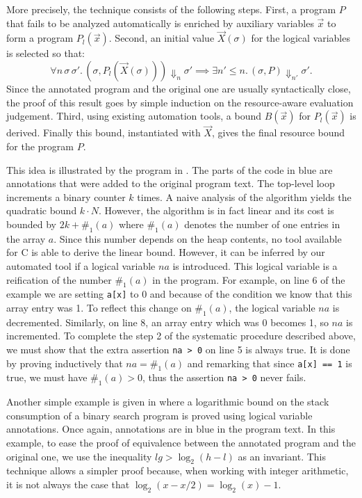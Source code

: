 \documentclass[nocopyrightspace,preprint,pldi]{sigplanconf-pldi15}
\newcommand{\pref}[1]{\prettyref{#1}}
\begin{document}
More precisely, the technique consists of the following steps. First,
a program $P$ that fails to be analyzed automatically is enriched by
auxiliary variables $\vec x$ to form a program
$P_l(\vec x)$.  Second, an initial value $\vec X(\sigma)$ for the
logical variables is selected so that:
$$
\forall n\, \sigma\, \sigma'.\,
  (\sigma, P_l(\vec X(\sigma))) \Downarrow_n \sigma'
    {\implies}
  \exists n' {\le} n.\,
    (\sigma, P) \Downarrow_{n'} \sigma'.
$$
Since the annotated program and the original one are usually
syntactically close, the proof of this result goes
by simple induction on the resource-aware evaluation judgement.
Third, using existing automation tools, a bound $B(\vec x)$ for
$P_l(\vec x)$ is derived.  Finally this bound, instantiated with
$\vec X$, gives the final resource bound for the program $P$.

This idea is illustrated by the program in \pref{fig:xmplincaux}.
The parts of the code in blue are annotations that were added
to the original program text.  The top-level loop increments
a binary counter $k$ times.  A naive analysis of
the algorithm yields the quadratic bound $k \cdot N$.
However, the algorithm is in fact linear and its cost is bounded
by $2k + \#_1(a)$ where $\#_1(a)$ denotes
the number of one entries in the array $a$.  Since this
number depends on the heap contents, no tool available
for C is able to derive the linear bound.  However, it can be inferred
by our automated tool if a logical variable $na$ is introduced.
This logical variable is a reification of the
number $\#_1(a)$ in the program.  For example, on line 6 of the example
we are setting \lstinline{a[x]} to 0 and because of the condition we
know that this array entry was 1.  To reflect this change on
$\#_1(a)$, the logical variable $na$ is decremented.
Similarly, on line 8, an array entry which was 0 becomes 1, so
$na$ is incremented.  To complete the step 2 of the systematic
procedure described above, we must show that the extra assertion
\lstinline{na > 0} on line 5 is always true.  It
is done by proving inductively that $na = \#_1(a)$
and remarking that since \lstinline{a[x] == 1} is true, we must have
$\#_1(a) > 0$, thus the assertion \lstinline{na > 0} never fails. %

Another simple example is given in \pref{fig:xmplbsaux} where
a logarithmic bound on the stack consumption of a binary search
program is proved using logical variable annotations.  Once again,
annotations are in blue in the program text.  In this example,
to ease the proof of equivalence between the annotated program
and the original one, we use the inequality $lg >
\log_2(h-l)$ as an invariant.  This technique allows a simpler
proof because, when working with integer arithmetic, it is not always
the case that $\log_2(x-x/2) = \log_2(x)-1$.
\end{document}
